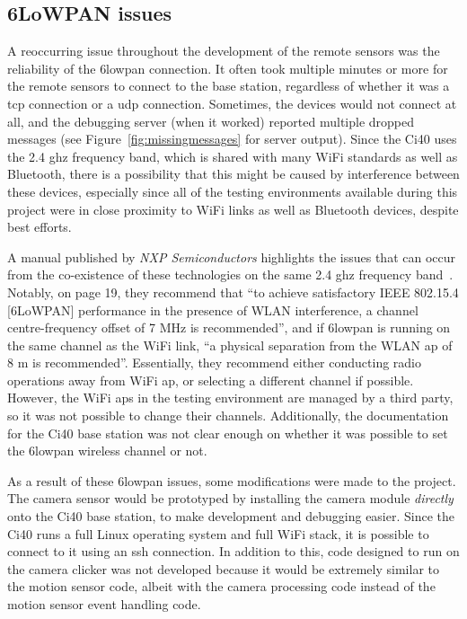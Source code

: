 \subsection{6LoWPAN issues}
A reoccurring issue throughout the development of the remote sensors was the
reliability of the \gls{6lowpan} connection. It often took multiple minutes
or more for the remote sensors to connect to the base station, regardless of
whether it was a \acrshort{tcp} connection or a \acrshort{udp} connection.
Sometimes, the devices would not connect at all, and the debugging server
(when it worked) reported multiple dropped messages (see
Figure~\ref{fig:missingmessages} for server output). Since the Ci40 uses the
2.4 \acrshort{ghz} frequency band, which is shared with many WiFi standards
as well as Bluetooth, there is a possibility that this might be caused by
interference between these devices, especially since all of the testing
environments available during this project were in close proximity to WiFi
links as well as Bluetooth devices, despite best efforts.

A manual published by \textit{NXP Semiconductors} highlights the issues that
can occur from the co-existence of these technologies on the same 2.4
\acrshort{ghz} frequency band~\cite{nxp2013ieee802154coexistence}. Notably,
on page 19, they recommend that ``to achieve satisfactory IEEE 802.15.4
[6LoWPAN] performance in the presence of WLAN interference, a channel
centre-frequency offset of 7 MHz is recommended'', and if \gls{6lowpan} is
running on the same channel as the WiFi link, ``a physical separation from
the WLAN \acrfull{ap} of 8 m is recommended''. Essentially, they recommend
either conducting radio operations away from WiFi \acrshort{ap}, or selecting
a different channel if possible. However, the WiFi \acrshort{ap}s in the
testing environment are managed by a third party, so it was not possible to
change their channels. Additionally, the documentation for the Ci40 base
station was not clear enough on whether it was possible to set the
\gls{6lowpan} wireless channel or not.

As a result of these \gls{6lowpan} issues, some modifications were made to
the project. The camera sensor would be prototyped by installing the camera
module \textit{directly} onto the Ci40 base station, to make development and
debugging easier. Since the Ci40 runs a full Linux operating system and full
WiFi stack, it is possible to connect to it using an \acrfull{ssh}
connection. In addition to this, code designed to run on the camera clicker
was not developed because it would be extremely similar to the motion sensor
code, albeit with the camera processing code instead of the motion sensor
event handling code.

